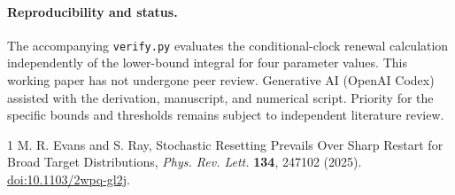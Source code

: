 \documentclass[11pt]{article}
\begin{document}
\paragraph{Reproducibility and status.}
The accompanying \texttt{verify.py} evaluates the conditional-clock renewal
calculation independently of the lower-bound integral for four parameter
values. This working paper has not undergone peer review. Generative AI
(OpenAI Codex) assisted with the derivation, manuscript, and numerical
script. Priority for the specific bounds and thresholds remains subject
to independent literature review.

\begin{thebibliography}{1}
 M. R. Evans and S. Ray,
Stochastic Resetting Prevails Over Sharp Restart for Broad Target
Distributions, \textit{Phys. Rev. Lett.} \textbf{134}, 247102 (2025).
\href{https://doi.org/10.1103/2wpq-gl2j}{doi:10.1103/2wpq-gl2j}.
\end{thebibliography}
\end{document}
